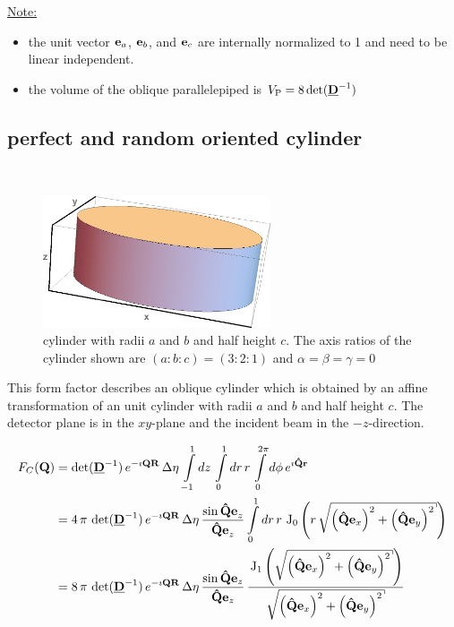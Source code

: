 \noindent\underline{Note:}
\begin{itemize}
\item the unit vector $\B{e}_a$, $\B{e}_b$, and $\B{e}_c$ are internally normalized to 1 and need to be linear independent.
\item the volume of the oblique parallelepiped is $V_\mathrm{P}=8\det(\M{D}^{-1})$
\end{itemize}

\subsection{perfect and random oriented cylinder} ~\\

\begin{figure}[htb]
\begin{center}
\includegraphics[width=0.6\textwidth]{../images/form_factor/supershapes/cylinder321.png}
\end{center}
\caption{cylinder with radii $a$ and $b$ and half height $c$. The axis ratios of the cylinder shown are $(a:b:c)=(3:2:1)$ and $\alpha=\beta=\gamma=0$}
\label{fig:opo_cylinder}
\end{figure}

This form factor describes an oblique cylinder which is obtained by an affine transformation of an unit cylinder with radii $a$ and $b$ and half height $c$. The detector plane is in the $xy$-plane and the incident beam in the $-z$-direction.


\begin{align}
F_C(\B{Q}) &=
\det(\M{D}^{-1})\, e^{-\imath\B{QR}}\, \Delta\eta\, \int\limits_{-1}^1
dz\, \int\limits_{0}^{1} dr\, r\, \int\limits_{0}^{2\pi} d\phi \,
e^{\imath\B{\hat{Q}r}} \nonumber \\
&=
4\, \pi\, \det(\M{D}^{-1})\, e^{-\imath\B{QR}}\, \Delta\eta\,
\frac{\sin\B{\hat{Q}e}_z}{\B{\hat{Q}e}_z}
\int\limits_{0}^1 dr\,r\,
\U{J}_0\left(r\, \sqrt{\left(\B{\hat{Q}}\B{e}_x\right)^2+
\left(\B{\hat{Q}}\B{e}_y\right)^2}\right)
\nonumber \\
&= \displaystyle
8\, \pi\,\det(\M{D}^{-1})\, e^{-\imath\B{QR}}\,
\Delta\eta\, \frac{\sin\B{\hat{Q}}\B{e}_z}{\B{\hat{Q}}\B{e}_z}
\, \frac{\U{J}_1\left(\sqrt{\left(\B{\hat{Q}}\B{e}_x\right)^2+
\left(\B{\hat{Q}}\B{e}_y\right)^2}\right)}{\sqrt{
\left(\B{\hat{Q}}\B{e}_x\right)^2+\left(\B{\hat{Q}}\B{e}_y\right)^2}}
\label{eq:form:C}
\end{align}

